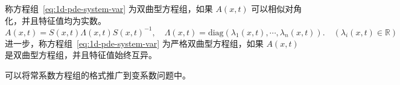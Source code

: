 \begin{definition}
    称方程组~\eqref{eq:1d-pde-system-var} 为双曲型方程组，如果 $A(x,t)$ 可以相似对角化，并且特征值均为实数。
    \[
        A(x,t) = S(x,t) \Lambda(x,t) S(x,t)^{-1},\quad
        \Lambda(x,t) = \text{diag}(\lambda_1(x,t),\cdots,\lambda_n(x,t)).\quad (\lambda_i(x,t) \in \mathbb{R})
    \]
    进一步，称方程组~\eqref{eq:1d-pde-system-var} 为严格双曲型方程组，如果 $A(x,t)$ 是双曲型方程组，并且特征值始终互异。
\end{definition}

可以将常系数方程组的格式推广到变系数问题中。
